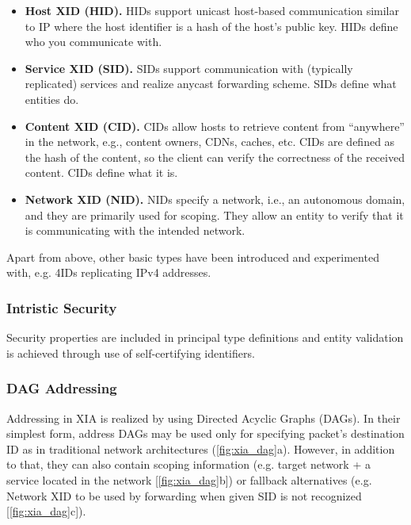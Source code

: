                 \begin{itemize}
                    \item \textbf{Host XID (HID).} HIDs support unicast host-based communication similar to IP where the host identifier is a hash of the host’s public key. HIDs define who you communicate with.
                    \item \textbf{Service XID (SID).} SIDs support communication with (typically replicated) services and realize anycast forwarding scheme. SIDs define what entities do.
                    \item \textbf{Content XID (CID).} CIDs allow hosts to retrieve content from ``anywhere'' in the network, e.g., content owners, CDNs, caches, etc. CIDs are defined as the hash of the content, so the client can verify the correctness of the received content. CIDs define what it is.
                    \item \textbf{Network XID (NID).} NIDs specify a network, i.e., an autonomous domain, and they are primarily used for scoping. They allow an entity to verify that it is communicating with the intended network.
                \end{itemize}

                Apart from above, other basic types have been introduced and experimented with, e.g. 4IDs replicating IPv4 addresses.

            \subsubsection{Intristic Security}

                Security properties are included in principal type definitions and entity validation is achieved through use of self-certifying identifiers.

            \subsubsection{DAG Addressing}

                Addressing in XIA is realized by using Directed Acyclic Graphs (DAGs). In their simplest form, address DAGs may be used only for specifying packet's destination ID as in traditional network architectures (\ref{fig:xia_dag}a). However, in addition to that, they can also contain scoping information (e.g. target network + a service located in the network [\ref{fig:xia_dag}b]) or fallback alternatives (e.g. Network XID to be used by forwarding when given SID is not recognized [\ref{fig:xia_dag}c]).

